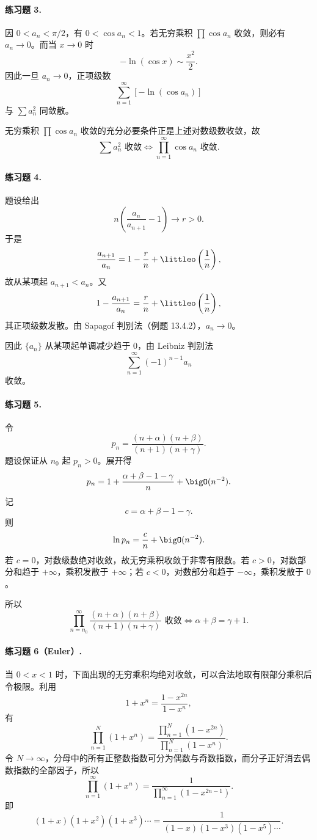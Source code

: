 \paragraph{练习题 3.}
\begin{xsolution}
因 $0<a_n<\pi/2$，有 $0<\cos a_n<1$。若无穷乘积 $\prod\cos a_n$ 收敛，则必有 $a_n\to0$。而当 $x\to0$ 时
\[
 -\ln(\cos x)\sim\frac{x^2}{2}.
\]
因此一旦 $a_n\to0$，正项级数
\[
 \sum_{n=1}^{\infty}[-\ln(\cos a_n)]
\]
与 $\sum a_n^2$ 同敛散。

无穷乘积 $\prod\cos a_n$ 收敛的充分必要条件正是上述对数级数收敛，故
\[
 \boxed{\sum a_n^2\text{ 收敛}\Longleftrightarrow\prod_{n=1}^{\infty}\cos a_n\text{ 收敛}.}
\]
\end{xsolution}

\paragraph{练习题 4.}
\begin{xsolution}
题设给出
\[
 n\left(\frac{a_n}{a_{n+1}}-1\right)\to r>0.
\]
于是
\[
 \frac{a_{n+1}}{a_n}=1-\frac r n+\littleo\left(\frac1n\right),
\]
故从某项起 $a_{n+1}<a_n$。又
\[
 1-\frac{a_{n+1}}{a_n}
 =\frac r n+\littleo\left(\frac1n\right),
\]
其正项级数发散。由 Sapagof 判别法（例题 13.4.2），$a_n\to0$。

因此 $\{a_n\}$ 从某项起单调减少趋于 $0$，由 Leibniz 判别法
\[
 \sum_{n=1}^{\infty}(-1)^{n-1}a_n
\]
收敛。
\end{xsolution}

\paragraph{练习题 5.}
\begin{xsolution}
令
\[
 p_n=\frac{(n+\alpha)(n+\beta)}{(n+1)(n+\gamma)}.
\]
题设保证从 $n_0$ 起 $p_n>0$。展开得
\[
 p_n
 =1+\frac{\alpha+\beta-1-\gamma}{n}+\bigO(n^{-2}).
\]
记
\[
 c=\alpha+\beta-1-\gamma.
\]
则
\[
 \ln p_n=\frac c n+\bigO(n^{-2}).
\]
若 $c=0$，对数级数绝对收敛，故无穷乘积收敛于非零有限数。若 $c>0$，对数部分和趋于 $+\infty$，乘积发散于 $+\infty$；若 $c<0$，对数部分和趋于 $-\infty$，乘积发散于 $0$。

所以
\[
 \boxed{\prod_{n=n_0}^{\infty}\frac{(n+\alpha)(n+\beta)}{(n+1)(n+\gamma)}
 \text{ 收敛}\Longleftrightarrow \alpha+\beta=\gamma+1.}
\]
\end{xsolution}

\paragraph{练习题 6（Euler）.}
\begin{xsolution}
当 $0<x<1$ 时，下面出现的无穷乘积均绝对收敛，可以合法地取有限部分乘积后令极限。利用
\[
 1+x^n=\frac{1-x^{2n}}{1-x^n},
\]
有
\[
 \prod_{n=1}^{N}(1+x^n)
 =\frac{\prod_{n=1}^{N}(1-x^{2n})}{\prod_{n=1}^{N}(1-x^n)}.
\]
令 $N\to\infty$，分母中的所有正整数指数可分为偶数与奇数指数，而分子正好消去偶数指数的全部因子，所以
\[
 \prod_{n=1}^{\infty}(1+x^n)
 =\frac1{\prod_{n=1}^{\infty}(1-x^{2n-1})}.
\]
即
\[
 \boxed{(1+x)(1+x^2)(1+x^3)\cdots
 =\frac1{(1-x)(1-x^3)(1-x^5)\cdots}.}
\]
\end{xsolution}

